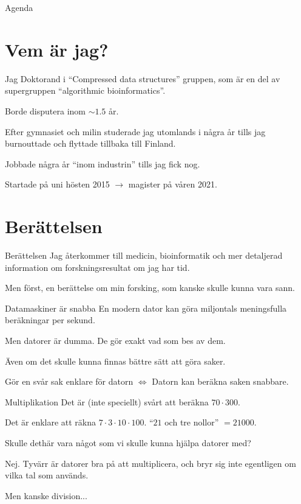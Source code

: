 \documentclass[11pt, aspectratio=169, table]{beamer}
\begin{document}

\begin{frame}{Agenda}
\setlength\parskip{\fill}
\tableofcontents
\end{frame}

\section{Vem är jag?}
\begin{frame}{Jag}
\setlength{\parskip}{\fill}
Doktorand i ``Compressed data structures'' gruppen, som är en del av supergruppen ``algorithmic bioinformatics''.

Borde disputera inom $\sim 1.5$ år.

Efter gymnasiet och milin studerade jag utomlands i några år tills jag burnouttade och flyttade tillbaka till Finland.

Jobbade några år ``inom industrin'' tills jag fick nog.

Startade på uni hösten 2015 $\to$ magister på våren 2021.
\end{frame}

\section{Berättelsen}
\begin{frame}{Berättelsen}
\setlength{\parskip}{\fill}
Jag återkommer till medicin, bioinformatik och mer detaljerad information om forskningsresultat om jag har tid.

Men först, en berättelse om min forsking, som kanske skulle kunna vara sann.
\end{frame}

\begin{frame}{Datamaskiner är snabba}
\setlength{\parskip}{\fill}
En modern dator kan göra miljontals meningsfulla beräkningar per sekund.

Men datorer är dumma. De gör \alert{exakt} vad som bes av dem. 

Även om det skulle kunna finnas bättre sätt att göra saker.

Gör en svår sak enklare för datorn $\Leftrightarrow$ Datorn kan beräkna saken snabbare.
\end{frame}

\begin{frame}{Multiplikation}
\setlength{\parskip}{\fill}
Det är (inte speciellt) svårt att beräkna $70 \cdot 300$.

Det är enklare att räkna $7 \cdot 3 \cdot 10 \cdot 100$. ``$21$ och tre nollor'' $= 21000$.

Skulle dethär vara något som vi skulle kunna hjälpa datorer med?

\pause
Nej. Tyvärr är datorer bra på att multiplicera, och bryr sig inte egentligen om vilka tal som används.

\pause
Men kanske division...
\end{frame}
\end{document}
